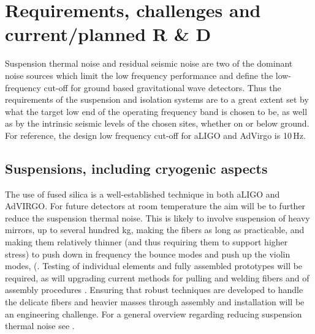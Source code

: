 \section{Requirements, challenges and current/planned R \& D}
Suspension thermal noise and residual seismic noise are two of the dominant noise sources which limit the low frequency performance and define the low-frequency cut-off for ground based gravitational wave detectors. Thus the requirements of the suspension and isolation systems are to a great extent set by what the target low end of the operating frequency band is chosen to be, as well as by the intrinsic seismic levels of the chosen sites, whether on or below ground. For reference, the design low frequency cut-off for aLIGO and AdVirgo is 10\,Hz.
\subsection{Suspensions, including cryogenic aspects}
The use of fused silica is a well-established technique in both aLIGO and AdVIRGO. For future detectors at room temperature the aim will be to further reduce the suspension thermal noise. This is likely to involve suspension of heavy mirrors, up to several hundred kg, making the fibers as long as practicable, and making them relatively thinner (and thus requiring them to support higher stress) to push down in frequency the bounce modes and push up the violin modes, (\cite{Heptonstall:2014, Bell:2014,aisa:2016advanced, Tokmakov:2012, Amico:2002_monolithic}.  Testing of individual elements and fully assembled prototypes will be required, as will upgrading current methods for pulling and welding fibers and of assembly procedures \cite{Hammond:2014,Travasso:2018}. Ensuring that robust techniques are developed to handle the delicate fibers and heavier masses through assembly and installation will be an engineering challenge. For a general overview regarding reducing suspension thermal noise see \cite{Hammond:2014, Hammond:2012}.

